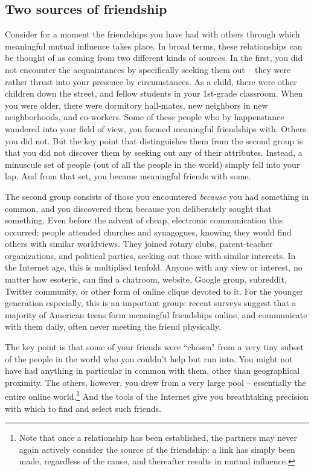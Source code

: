 
\subsection{Two sources of friendship}

Consider for a moment the friendships you have had with others through which
meaningful mutual influence takes place. In broad terms, these relationships
can be thought of as coming from two different kinds of sources. In the first,
you did not encounter the acquaintances by specifically seeking them out --
they were rather thrust into your presence by circumstances. As a child, there
were other children down the street, and fellow students in your 1st-grade
classroom. When you were older, there were dormitory hall-mates, new neighbors
in new neighborhoods, and co-workers. Some of these people who by happenstance
wandered into your field of view, you formed meaningful friendships with.
Others you did not. But the key point that distinguishes them from the second
group is that you did not discover them by seeking out any of their
attributes. Instead, a minuscule set of people (out of all the people in the
world) simply fell into your lap. And from that set, you became meaningful
friends with some.

The second group consists of those you encountered \textit{because} you had
something in common, and you discovered them because you deliberately sought
that something. Even before the advent of cheap, electronic communication this
occurred: people attended churches and synagogues, knowing they would find
others with similar worldviews. They joined rotary clubs, parent-teacher
organizations, and political parties, seeking out those with similar
interests. In the Internet age, this is multiplied tenfold. Anyone with any
view or interest, no matter how esoteric, can find a chatroom, website, Google
group, subreddit, Twitter community, or other form of online clique devoted to
it. For the younger generation especially, this is an important group: recent
surveys suggest that a majority of American teens form meaningful friendships
online, and communicate with them daily, often never meeting the friend
physically.\cite{amanda_lenhart_teens_2015}

The key point is that some of your friends were ``chosen" from a very tiny
subset of the people in the world who you couldn't help but run into. You
might not have had anything in particular in common with them, other than
geographical proximity. The others, however, you drew from a very large pool
-- essentially the entire online world.\footnote{Note that once a relationship
has been established, the partners may never again actively consider the
source of the friendship: a link has simply been made, regardless of the
cause, and thereafter results in mutual influence.} And the tools of the
Internet give you breathtaking precision with which to find and select such
friends.

